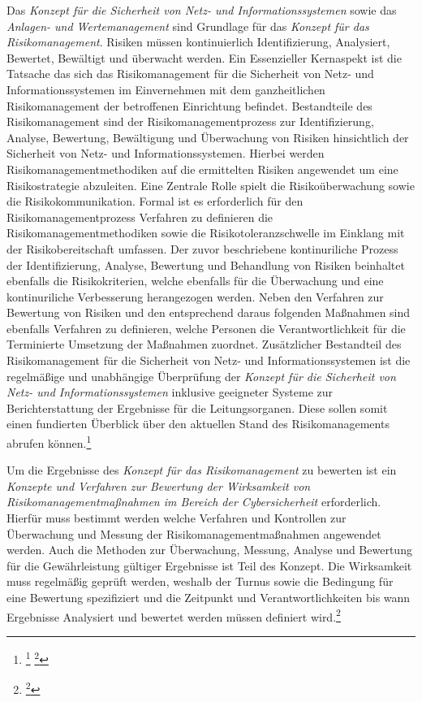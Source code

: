 \documentclass[11pt,a4paper,hidelinks]{article}   %
\begin{document}

                Das \emph{Konzept für die Sicherheit von Netz- und Informationssystemen} sowie das \emph{Anlagen- und Wertemanagement} sind Grundlage für das \emph{Konzept für das Risikomanagement}. Risiken müssen kontinuierlich Identifizierung, Analysiert, Bewertet, Bewältigt und überwacht werden. Ein Essenzieller Kernaspekt ist die Tatsache das sich das Risikomanagement für die Sicherheit von Netz- und Informationssystemen im Einvernehmen mit dem ganzheitlichen Risikomanagement der betroffenen Einrichtung befindet. Bestandteile des Risikomanagement sind der Risikomanagementprozess zur Identifizierung, Analyse, Bewertung, Bewältigung und Überwachung von Risiken hinsichtlich der Sicherheit von Netz- und Informationssystemen. Hierbei werden Risikomanagementmethodiken auf die ermittelten Risiken angewendet um eine Risikostrategie abzuleiten. Eine Zentrale Rolle spielt die Risikoüberwachung sowie die Risikokommunikation. Formal ist es erforderlich für den Risikomanagementprozess Verfahren zu definieren die Risikomanagementmethodiken sowie die Risikotoleranzschwelle im Einklang mit der Risikobereitschaft umfassen. Der zuvor beschriebene kontinuriliche Prozess der Identifizierung, Analyse, Bewertung und Behandlung von Risiken beinhaltet ebenfalls die Risikokriterien, welche ebenfalls für die Überwachung und eine kontinuriliche Verbesserung herangezogen werden. Neben den Verfahren zur Bewertung von Risiken und den entsprechend daraus folgenden Maßnahmen sind ebenfalls Verfahren zu definieren, welche Personen die Verantwortlichkeit für die Terminierte Umsetzung der Maßnahmen zuordnet. Zusätzlicher Bestandteil des Risikomanagement für die Sicherheit von Netz- und Informationssystemen ist die regelmäßige und unabhängige Überprüfung der \emph{Konzept für die Sicherheit von Netz- und Informationssystemen} inklusive geeigneter Systeme zur Berichterstattung der Ergebnisse für die Leitungsorganen. Diese sollen somit einen fundierten Überblick über den aktuellen Stand des Risikomanagements abrufen können.\footnote{
                    \footcite[Vgl. Anhang, Nummer 2][]{EU2024-2690}
                    \footcite[Risikomanagement in Unternehmen allgegenwärtig][]{MISSING}                
                }\medbreak


                Um die Ergebnisse des \emph{Konzept für das Risikomanagement} zu bewerten ist ein \emph{Konzepte und Verfahren zur Bewertung der Wirksamkeit von Risikomanagementmaßnahmen im Bereich der Cybersicherheit} erforderlich. Hierfür muss bestimmt werden welche Verfahren und Kontrollen zur Überwachung und Messung der Risikomanagementmaßnahmen angewendet werden. Auch die Methoden zur Überwachung, Messung, Analyse und Bewertung für die Gewährleistung gültiger Ergebnisse ist Teil des Konzept. Die Wirksamkeit muss regelmäßig geprüft werden, weshalb der Turnus sowie die Bedingung für eine Bewertung spezifiziert und die Zeitpunkt und Verantwortlichkeiten bis wann Ergebnisse Analysiert und bewertet werden müssen definiert wird.\footnote{
                    \footcite[Vgl. Anhang, Nummer 7][]{EU2024-2690}
                }\medbreak
\end{document}
